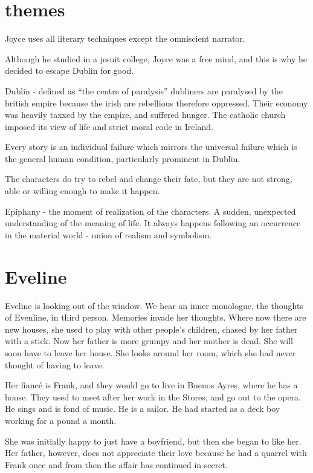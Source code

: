 \documentclass{article}
\title{\jobname}
\author{Eugenio Animali}
\begin{document}
\maketitle

\section{themes}
Joyce uses all literary techniques except the omniscient narrator.

Although he studied in a jesuit college, Joyce was a free mind, and this is why he decided to escape Dublin for good.

Dublin - defined as ``the centre of paralysis'' dubliners are paralysed by the british empire because the irish are rebellious therefore oppressed. Their economy was heavily taxxed by the empire, and suffered hunger. The catholic church imposed its view of life and strict moral code in Ireland.

Every story is an individual failure which mirrors the universal failure which is the general human condition, particularly prominent in Dublin.

The characters do try to rebel and change their fate, but they are not strong, able or willing enough to make it happen.

Epiphany - the moment of realization of the characters. A sudden, unexpected understanding of the meaning of life. It always happens following an occurrence in the material world - union of realism and symbolism.

\section{Eveline}

Eveline is looking out of the window. We hear an inner monologue, the thoughts of Evenline, in third person. Memories invade her thoughts. Where now there are new houses, she used to play with other people's children, chased by her father with a stick. Now her father is more grumpy and her mother is dead. She will soon have to leave her house. She looks around her room, which she had never thought of having to leave.

Her fiancé is Frank, and they would go to live in Buenos Ayres, where he has a house. They used to meet after her work in the Stores, and go out to the opera. He sings and is fond of music. He is a sailor. He had started as a deck boy working for a pound a month.

She was initially happy to just have a boyfriend, but then she began to like her. Her father, however, does not appreciate their love because he had a quarrel with Frank once and from then the affair has continued in secret.
\end{document}
